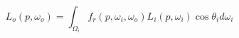\documentclass{article}
\begin{document}
\[L_{o}(p, \omega_{o}) = \int_{\Omega_{i}} f_{r}(p, \omega_{i}, \omega_{o})L_{i}(p, \omega_{i})\cos\theta_{i} d\omega_{i}\]
\pagebreak
\end{document}
